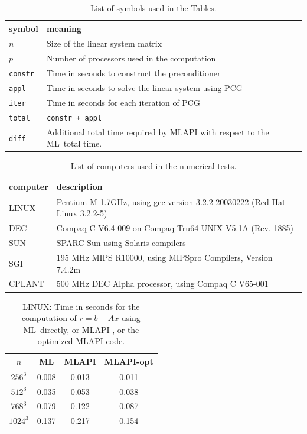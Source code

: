 \documentclass{article}[11pt]
\newcommand{\ML}     {{\sc ML}}
\newcommand{\MLAPI}  {{\sc MLAPI }}
\newcommand{\mlapi}  {{\sc MLAPI }}
\newcommand{\MLAPIns}  {{\sc MLAPI}}
\begin{document}
\begin{table}
\begin{center}
\begin{tabular}{| p{2cm}  p{10cm} |}
\hline
symbol & meaning \\
\hline
$n$          & Size of the linear system matrix \\
$p$          & Number of processors used in the computation \\
\tt constr   & Time in seconds to construct the preconditioner \\
\tt appl     & Time in seconds to solve the linear system using PCG\\
\tt iter     & Time in seconds for each iteration of PCG \\
\tt total    & \tt constr + appl \\
\tt diff     & Additional total time required by \mlapi with respect to the
\ML\ total time.\\
\hline
\end{tabular}
\caption{List of symbols used in the Tables.}
\label{tab:symbol}
\end{center}
\end{table}

\begin{table}
\begin{center}
\begin{tabular}{| p{2cm}  p{10cm} |}
\hline
computer & description \\
\hline
LINUX  & Pentium M 1.7GHz, using gcc version 3.2.2 20030222 (Red Hat Linux
                                                             3.2.2-5) \\
DEC    & Compaq C V6.4-009 on Compaq Tru64 UNIX V5.1A (Rev. 1885) \\
SUN    & SPARC Sun using Solaris compilers \\
SGI    & 195 MHz MIPS R10000, using MIPSpro Compilers, Version 7.4.2m \\
CPLANT & 500 MHz DEC Alpha processor, using Compaq C V65-001 \\
\hline
\end{tabular}
\caption{List of computers used in the numerical tests.}
\label{tab:machines}
\end{center}
\end{table}


\begin{table}
\begin{center}
\begin{tabular}{| c | c c c |}
\hline
$n$ & \ML & \MLAPI & \MLAPIns-opt \\
\hline
$256^3$  & 0.008 & 0.013 & 0.011 \\
$512^3$  & 0.035 & 0.053 & 0.038 \\
$768^3$  & 0.079 & 0.122 & 0.087 \\ 
$1024^3$ & 0.137 & 0.217 & 0.154 \\ 
\hline
\end{tabular}
\caption{LINUX: Time in seconds for the computation of $r = b - A x$ using \ML\ directly, or \MLAPI, or the optimized \MLAPI code.}
\label{tab:linux-res}
\end{center}
\end{table}
\end{document}
